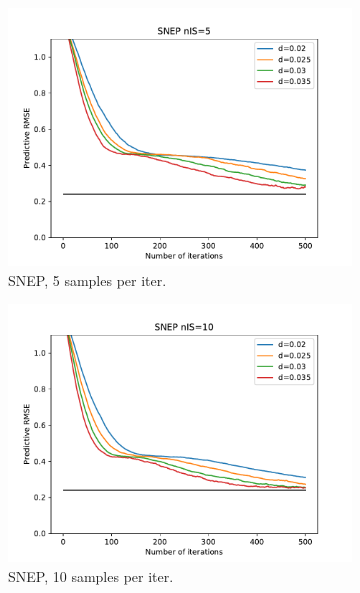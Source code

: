 \begin{landscape}
\begin{figure}[ht]
	\begin{subfigure}[b]{0.45\textwidth}
		\includegraphics[width=\textwidth]{figures/snep/rms-snep-nis05}
		\caption{SNEP, 5 samples per iter.}
		\label{res-snep-5}
	\end{subfigure}
	\begin{subfigure}[b]{0.45\textwidth}
		\includegraphics[width=\textwidth]{figures/snep/rms-snep-nis10}
		\caption{SNEP, 10 samples per iter.}
		\label{res-snep-10}
	\end{subfigure}
	\begin{subfigure}[b]{0.45\textwidth}

\end{subfigure}
\end{figure}
\end{landscape}
